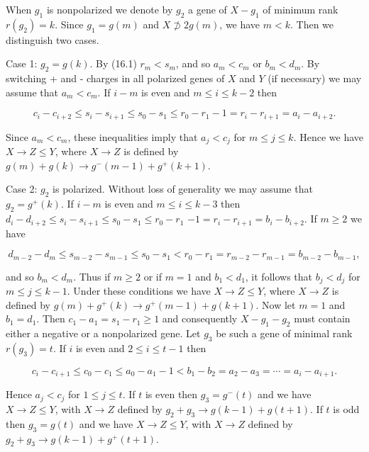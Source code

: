 \documentclass[10pt]{article}
\begin{document}
When $g_{1}$ is nonpolarized we denote by $g_{2}$ a gene of $X-g_{1}$ of minimum rank $r\left(g_{2}\right)=k$. Since $g_{1}=g(m)$ and $X \not \supset 2 g(m)$, we have $m<k$. Then we distinguish two cases.

Case 1: $g_{2}=g(k)$. By (16.1) $r_{m}<s_{m}$, and so $a_{m}<c_{m}$ or $b_{m}<d_{m}$. By switching + and - charges in all polarized genes of $X$ and $Y$ (if necessary) we may assume that $a_{m}<c_{m}$. If $i-m$ is even and $m \leqslant i \leqslant k-2$ then

$$
c_{i}-c_{i+2} \leqslant s_{i}-s_{i+1} \leqslant s_{0}-s_{1} \leqslant r_{0}-r_{1}-1=r_{i}-r_{i+1}=a_{i}-a_{i+2} .
$$

Since $a_{m}<c_{m}$, these inequalities imply that $a_{j}<c_{j}$ for $m \leqslant j \leqslant k$. Hence we have $X \rightarrow Z \leqslant Y$, where $X \rightarrow Z$ is defined by $g(m)+g(k) \rightarrow g^{-}(m-1)+g^{+}(k+1)$.

Case 2: $g_{2}$ is polarized. Without loss of generality we may assume that $g_{2}=g^{+}(k)$. If $i-m$ is even and $m \leqslant i \leqslant k-3$ then $d_{i}-d_{i+2} \leqslant s_{i}-s_{i+1} \leqslant s_{0}-s_{1} \leqslant r_{0}-r_{1}$ $-1=r_{i}-r_{i+1}=b_{i}-b_{i+2}$. If $m \geqslant 2$ we have

$$
d_{m-2}-d_{m} \leqslant s_{m-2}-s_{m-1} \leqslant s_{0}-s_{1}<r_{0}-r_{1}=r_{m-2}-r_{m-1}=b_{m-2}-b_{m-1},
$$

and so $b_{m}<d_{m}$. Thus if $m \geqslant 2$ or if $m=1$ and $b_{1}<d_{1}$, it follows that $b_{j}<d_{j}$ for $m \leqslant j \leqslant k-1$. Under these conditions we have $X \rightarrow Z \leqslant Y$, where $X \rightarrow Z$ is defined by $g(m)+g^{+}(k) \rightarrow g^{+}(m-1)+g(k+1)$. Now let $m=1$ and $b_{1}=d_{1}$. Then $c_{1}-a_{1}=s_{1}-r_{1} \geqslant 1$ and consequently $X-g_{1}-g_{2}$ must contain either a negative or a nonpolarized gene. Let $g_{3}$ be such a gene of minimal rank $r\left(g_{3}\right)=t$. If $i$ is even and $2 \leqslant i \leqslant t-1$ then

$$
c_{i}-c_{i+1} \leqslant c_{0}-c_{1} \leqslant a_{0}-a_{1}-1<b_{1}-b_{2}=a_{2}-a_{3}=\cdots=a_{i}-a_{i+1} .
$$

Hence $a_{j}<c_{j}$ for $1 \leqslant j \leqslant t$. If $t$ is even then $g_{3}=g^{-}(t)$ and we have $X \rightarrow Z \leqslant Y$, with $X \rightarrow Z$ defined by $g_{2}+g_{3} \rightarrow g(k-1)+g(t+1)$. If $t$ is odd then $g_{3}=g(t)$ and we have $X \rightarrow Z \leqslant Y$, with $X \rightarrow Z$ defined by $g_{2}+g_{3} \rightarrow g(k-1)+g^{+}(t+1)$.
\end{document}
